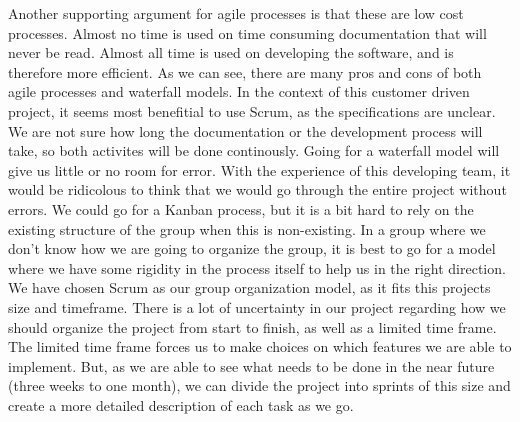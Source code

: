 \newline
\newline
Another supporting argument for agile processes is that these are low cost processes. Almost no time is used on time consuming documentation that will never be read. Almost all time is used on developing the software, and is therefore more efficient. 
\newline
\newline
As we can see, there are many pros and cons of both agile processes and waterfall models. In the context of this customer driven project, it seems most benefitial to use Scrum, as the specifications are unclear. We are not sure how long the documentation or the development process will take, so both activites will be done continously. Going for a waterfall model will give us little or no room for error. With the experience of this developing team, it would be ridicolous to think that we would go through the entire project without errors. 
\newline
\newline
We could go for a Kanban process, but it is a bit hard to rely on the existing structure of the group when this is non-existing. In a group where we don’t know how we are going to organize the group, it is best to go for a model where we have some rigidity in the process itself to help us in the right direction. 
\newline
\newline
We have chosen Scrum as our group organization model, as it fits this projects size and timeframe. There is a lot of uncertainty in our project regarding how we should organize the project from start to finish, as well as a limited time frame. The limited time frame forces us to make choices on which features we are able to implement.  But, as we are able to see what needs to be done in the near future (three weeks to one month), we can divide the project into sprints of this size and create a more detailed description of each task as we go.

